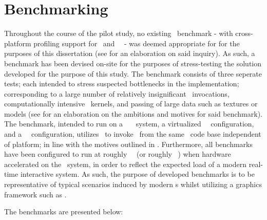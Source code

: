 \section{Benchmarking}
\label{sec:methodologyexperiment_benchmarking}
Throughout the course of the pilot study, no existing \dvttermopenglestwopointo\ benchmark - with cross-platform profiling support for \dvttermandroid\ and \dvttermxeleven\ \dvttermlinux\ - was deemed appropriate for for the purposes of this dissertation (see  for an elaboration on said inquiry).
As such, a benchmark has been devised on-site for the purposes of stress-testing the solution developed for the purpose of this study.
The benchmark consists of three seperate tests; each intended to stress suspected bottlenecks in the implementation; corresponding to a large number of relatively insignificant \dvttermopengl\ invocations, computationally intensive \dvttermgpu\ kernels, and passing of large data such as textures or models (see  for an elaboration on the ambitions and motives for said benchmark).
The benchmark, intended to run on a \dvttermhost\ \dvttermfedora\ \dvttermlinux\ system, a virtualized \dvttermsimics\ \dvttermfedora\ configuration, and a \dvttermqemu\ \dvttermandroid\ configuration, utilizes \dvttermjni\ to invoke \dvttermopengles\ from the same \dvttermc\ code base independent of platform; in line with the motives outlined in .
Furthermore, all benchmarks have been configured to run at roughly ~\milli\second\ (or roughly ~\dvttermfps ) when hardware accelerated on the \dvttermhost\ system, in order to reflect the expected load of a modern real-time interactive system.
As such, the purpose of developed benchmarks is to be representative of typical scenarios induced by modern \dvttermgui s whilst utilizing a graphics framework such as \dvttermopengl .

The benchmarks are presented below:



